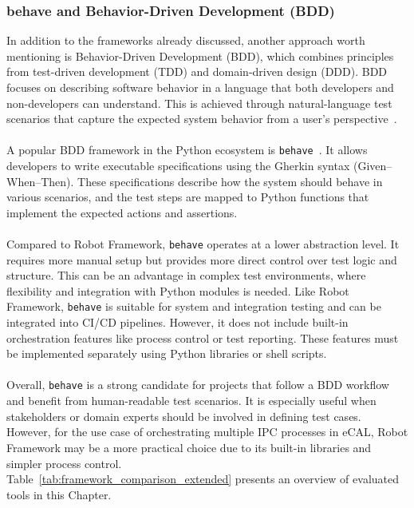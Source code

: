\newpage
\subsubsection*{behave and Behavior-Driven Development (BDD)}

In addition to the frameworks already discussed, another approach worth mentioning is Behavior-Driven Development (BDD), which combines principles from test-driven development (TDD) and domain-driven design (DDD). BDD focuses on describing software behavior in a language that both developers and non-developers can understand. This is achieved through natural-language test scenarios that capture the expected system behavior from a user's perspective~\cite{North2006}.
\\
\\
A popular BDD framework in the Python ecosystem is \texttt{behave}~\cite{BehaveDocs}. It allows developers to write executable specifications using the Gherkin syntax (Given–When–Then). These specifications describe how the system should behave in various scenarios, and the test steps are mapped to Python functions that implement the expected actions and assertions.
\\
\\
Compared to Robot Framework, \texttt{behave} operates at a lower abstraction level. It requires more manual setup but provides more direct control over test logic and structure. This can be an advantage in complex test environments, where flexibility and integration with Python modules is needed. Like Robot Framework, \texttt{behave} is suitable for system and integration testing and can be integrated into CI/CD pipelines. However, it does not include built-in orchestration features like process control or test reporting. These features must be implemented separately using Python libraries or shell scripts.
\\
\\
Overall, \texttt{behave} is a strong candidate for projects that follow a BDD workflow and benefit from human-readable test scenarios. It is especially useful when stakeholders or domain experts should be involved in defining test cases. However, for the use case of orchestrating multiple IPC processes in eCAL, Robot Framework may be a more practical choice due to its built-in libraries and simpler process control.
\\

Table~\ref{tab:framework_comparison_extended} presents an overview of evaluated tools in this Chapter.

